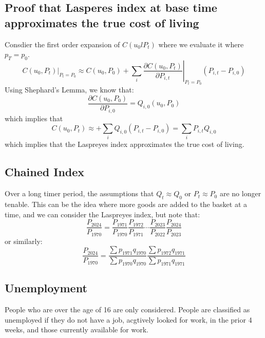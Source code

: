 \documentclass[11pt]{article}
\newtheorem{definition}{Definition}[section]
\begin{document}
\subsection{Proof that Lasperes index at base time approximates the true cost of living}
Consdier the first order expansion of $C(u_0l P_t)$ where we evaluate it where $p_T = p_0$. 
\[
C(u_0, P_t)\big|_{P_t = P_0} \approx C(u_0, P_0) + \sum_i \left. \frac{\partial C(u_0, P_t)}{\partial P_{i,t}} \right|_{P_t = P_0} (P_{i,t} - P_{i,0})
\]
Using Shephard's Lemma, we know that:
\[
\frac{\partial C(u_0, P_0)}{\partial P_{i, 0}} = Q_{i,0}(u_0,P_0)
\]
which implies that 
\[
C(u_0, P_t) \approx + \sum_i Q_{i,0} (P_{i,t} - P_{i,0}) = \sum_i P_{i,t} Q_{i,0}
\]
which implies that the Laspreyes index approximates the true cost of living. 
\subsection{Chained Index}
Over a long timer period, the assumptions that $Q_t \approx Q_0$ or $P_t \approx P_0$ are no longer tenable. This can be the idea where more goods are added to the basket at a time, and we can consider the Laspreyes index, but note that:
\[
\frac{P_{2024}}{P_{1970}} = \frac{P_{1971}}{P_{1970}} \frac{P_{1972}}{P_{1971}} \cdots \frac{P_{2023}}{P_{2022}} \frac{P_{2024}}{P_{2023}}
\]
or similarly:
\[
\frac{P_{2024}}{P_{1970}} = \frac{\sum p_{1971}q_{1970}}{\sum p_{1970}q_{1970}} \frac{\sum p_{1972} q_{1971}}{\sum p_{1971} q_{1971}}
\]
\subsection{Unemployment}
People who are over the age of 16 are only considered. People are classified as unemployed if they do not have a job, acgtively looked for work, in the prior 4 weeks, and those currently available for work. 



\end{document}
